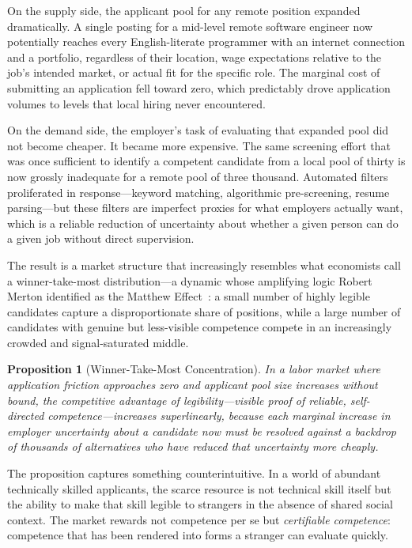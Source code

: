 \documentclass[12pt, a4paper]{article}
\theoremstyle{plain}
\newtheorem{proposition}{Proposition}[section]
\theoremstyle{definition}
\theoremstyle{remark}
\begin{document}
On the supply side, the applicant pool for any remote position expanded dramatically.
A single posting for a mid-level remote software engineer now potentially
reaches every English-literate programmer with an internet connection and a portfolio,
regardless of their location, wage expectations relative to the job's intended market,
or actual fit for the specific role.
The marginal cost of submitting an application fell toward zero,
which predictably drove application volumes to levels that local hiring never encountered.

On the demand side, the employer's task of evaluating that expanded pool
did not become cheaper. It became more expensive.
The same screening effort that was once sufficient to identify a competent candidate
from a local pool of thirty is now grossly inadequate for a remote pool of three thousand.
Automated filters proliferated in response---keyword matching, algorithmic pre-screening,
resume parsing---but these filters are imperfect proxies for what employers actually want,
which is a reliable reduction of uncertainty about whether a given person
can do a given job without direct supervision.

The result is a market structure that increasingly resembles
what economists call a winner-take-most distribution---a dynamic
whose amplifying logic Robert Merton identified as the Matthew Effect~\cite{merton1968}:
a small number of highly legible candidates capture a disproportionate share of positions,
while a large number of candidates with genuine but less-visible competence
compete in an increasingly crowded and signal-saturated middle.

\begin{proposition}[Winner-Take-Most Concentration]
In a labor market where application friction approaches zero and applicant pool size
increases without bound, the competitive advantage of legibility---visible proof
of reliable, self-directed competence---increases superlinearly,
because each marginal increase in employer uncertainty about a candidate
now must be resolved against a backdrop of thousands of alternatives
who have reduced that uncertainty more cheaply.
\end{proposition}

The proposition captures something counterintuitive.
In a world of abundant technically skilled applicants,
the scarce resource is not technical skill itself but the ability to make
that skill legible to strangers in the absence of shared social context.
The market rewards not competence per se but \emph{certifiable competence}:
competence that has been rendered into forms a stranger can evaluate quickly.
\end{document}
